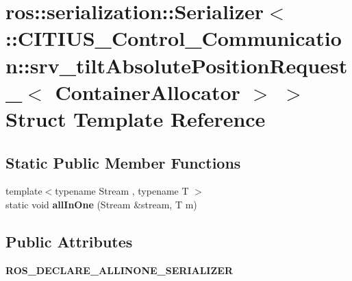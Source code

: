 \hypertarget{structros_1_1serialization_1_1_serializer_3_01_1_1_c_i_t_i_u_s___control___communication_1_1srv_a58f942d60a5e102f176314c15c55d33}{\section{ros\-:\-:serialization\-:\-:\-Serializer$<$ \-:\-:\-C\-I\-T\-I\-U\-S\-\_\-\-Control\-\_\-\-Communication\-:\-:srv\-\_\-tilt\-Absolute\-Position\-Request\-\_\-$<$ \-Container\-Allocator $>$ $>$ \-Struct \-Template \-Reference}
\label{structros_1_1serialization_1_1_serializer_3_01_1_1_c_i_t_i_u_s___control___communication_1_1srv_a58f942d60a5e102f176314c15c55d33}
}
\subsection*{\-Static \-Public \-Member \-Functions}
\begin{DoxyCompactItemize}
\item 
\hypertarget{structros_1_1serialization_1_1_serializer_3_01_1_1_c_i_t_i_u_s___control___communication_1_1srv_a58f942d60a5e102f176314c15c55d33_ad0e9817597b8f3ebc7421170af7977a8}{{\footnotesize template$<$typename Stream , typename T $>$ }\\static void {\bfseries all\-In\-One} (\-Stream \&stream, \-T m)}\label{structros_1_1serialization_1_1_serializer_3_01_1_1_c_i_t_i_u_s___control___communication_1_1srv_a58f942d60a5e102f176314c15c55d33_ad0e9817597b8f3ebc7421170af7977a8}

\end{DoxyCompactItemize}
\subsection*{\-Public \-Attributes}
\begin{DoxyCompactItemize}
\item 
\hypertarget{structros_1_1serialization_1_1_serializer_3_01_1_1_c_i_t_i_u_s___control___communication_1_1srv_a58f942d60a5e102f176314c15c55d33_a75f1d89bec6b403a96ec63ca14e0b3c7}{{\bfseries \-R\-O\-S\-\_\-\-D\-E\-C\-L\-A\-R\-E\-\_\-\-A\-L\-L\-I\-N\-O\-N\-E\-\_\-\-S\-E\-R\-I\-A\-L\-I\-Z\-E\-R}}\label{structros_1_1serialization_1_1_serializer_3_01_1_1_c_i_t_i_u_s___control___communication_1_1srv_a58f942d60a5e102f176314c15c55d33_a75f1d89bec6b403a96ec63ca14e0b3c7}

\end{DoxyCompactItemize}
